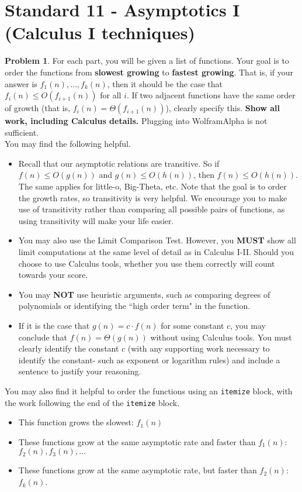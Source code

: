 \documentclass[11pt]{article}
\theoremstyle{definition}
\theoremstyle{definition}
\newtheorem{required}{Problem}
\theoremstyle{definition}
\begin{document}
\section{Standard 11 - Asymptotics I (Calculus I techniques)}
\begin{required}
For each part, you will be given a list of functions. Your goal is to order the functions from \textbf{slowest growing} to \textbf{fastest growing}. That is, if your answer is $f_{1}(n), \ldots, f_{k}(n)$, then it should be the case that $f_{i}(n) \leq O(f_{i+1}(n))$ for all $i$. If two adjacent functions have the same order of growth (that is, $f_{i}(n) = \Theta(f_{i+1}(n))$), clearly specify this. \textbf{Show all work, including Calculus details.} Plugging into WolframAlpha is not sufficient. \\

\noindent You may find the following helpful.
\begin{itemize}
\item Recall that our asymptotic relations are transitive. So if $f(n) \leq O(g(n))$ and $g(n) \leq O(h(n))$, then $f(n) \leq O(h(n))$. The same applies for little-o, Big-Theta, etc. Note that the goal is to order the growth rates, so transitivity is very helpful. We encourage you to make use of transitivity rather than comparing all possible pairs of functions, as using transitivity will make your life easier.

\item You may also use the Limit Comparison Test. However, you \textbf{MUST} show all limit computations at the same level of detail as in Calculus I-II. Should you choose to use Calculus tools, whether you use them correctly will count towards your score.

\item You may \textbf{NOT} use heuristic arguments, such as comparing degrees of polynomials or identifying the ``high order term" in the function.

\item If it is the case that $g(n) = c \cdot f(n)$ for some constant $c$, you may conclude that $f(n) = \Theta(g(n))$ without using Calculus tools. You must clearly identify the constant $c$ (with any supporting work necessary to identify the constant- such as exponent or logarithm rules) and include a sentence to justify your reasoning. 
\end{itemize}


\noindent You may also find it helpful to order the functions using an \texttt{itemize} block, with the work following the end of the \texttt{itemize} block.
\begin{itemize}
\item This function grows the slowest: $f_{1}(n)$
\item These functions grow at the same asymptotic rate and faster than $f_{1}(n)$: $f_{2}(n), f_{3}(n), \ldots$
\item These functions grow at the same asymptotic rate, but faster than $f_{2}(n)$: $f_{k}(n)$.
\end{itemize}



\end{required}
\end{document}
